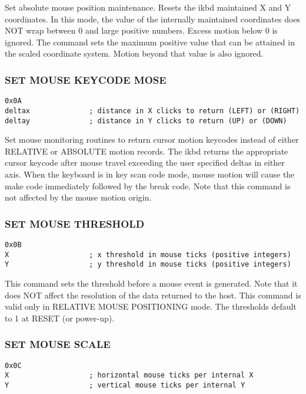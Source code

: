 \documentclass[a4paper,8pt,english]{sphinxmanual}
\begin{document}
Set absolute mouse position maintenance. Resets the ikbd maintained X and Y
coordinates.
In this mode, the value of the internally maintained coordinates does NOT wrap
between 0 and large positive numbers. Excess motion below 0 is ignored. The
command sets the maximum positive value that can be attained in the scaled
coordinate system. Motion beyond that value is also ignored.


\subsubsection{SET MOUSE KEYCODE MOSE}
\label{input/devices/atarikbd:set-mouse-keycode-mose}
\begin{Verbatim}[commandchars=\\\{\}]
0x0A
deltax              ; distance in X clicks to return (LEFT) or (RIGHT)
deltay              ; distance in Y clicks to return (UP) or (DOWN)
\end{Verbatim}

Set mouse monitoring routines to return cursor motion keycodes instead of
either RELATIVE or ABSOLUTE motion records. The ikbd returns the appropriate
cursor keycode after mouse travel exceeding the user specified deltas in
either axis. When the keyboard is in key scan code mode, mouse motion will
cause the make code immediately followed by the break code. Note that this
command is not affected by the mouse motion origin.


\subsubsection{SET MOUSE THRESHOLD}
\label{input/devices/atarikbd:set-mouse-threshold}
\begin{Verbatim}[commandchars=\\\{\}]
0x0B
X                   ; x threshold in mouse ticks (positive integers)
Y                   ; y threshold in mouse ticks (positive integers)
\end{Verbatim}

This command sets the threshold before a mouse event is generated. Note that
it does NOT affect the resolution of the data returned to the host. This
command is valid only in RELATIVE MOUSE POSITIONING mode. The thresholds
default to 1 at RESET (or power-up).


\subsubsection{SET MOUSE SCALE}
\label{input/devices/atarikbd:set-mouse-scale}
\begin{Verbatim}[commandchars=\\\{\}]
0x0C
X                   ; horizontal mouse ticks per internal X
Y                   ; vertical mouse ticks per internal Y
\end{Verbatim}
\end{document}
